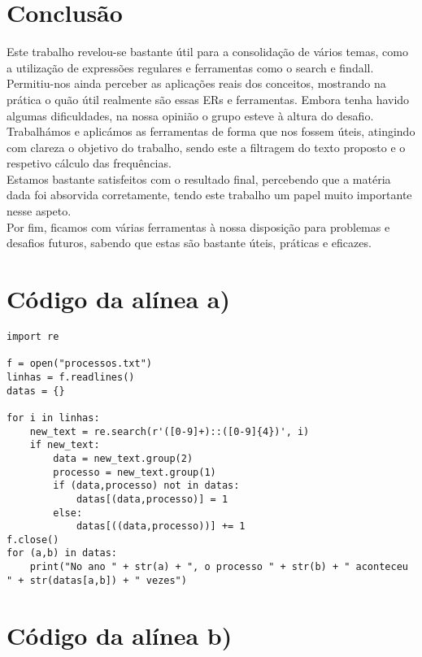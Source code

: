 \documentclass[11pt,a4paper]{report}%
\begin{document}
\chapter{Conclusão} \label{concl}
Este trabalho revelou-se bastante útil para a consolidação de vários temas, como a utilização de expressões regulares e ferramentas como o search e findall.
\\
Permitiu-nos ainda perceber as aplicações reais dos conceitos, mostrando na prática o quão útil realmente são essas ERs e ferramentas. Embora tenha havido algumas dificuldades, na nossa opinião o grupo esteve à altura do desafio. Trabalhámos e aplicámos as ferramentas de forma que nos fossem úteis, atingindo com clareza o objetivo do trabalho, sendo este a filtragem do texto proposto e o respetivo cálculo das frequências.
\\
Estamos bastante satisfeitos com o resultado final, percebendo que a matéria dada foi absorvida corretamente, tendo este trabalho um papel muito importante nesse aspeto.
\\
Por fim, ficamos com várias ferramentas à nossa disposição para problemas e desafios futuros, sabendo que estas são bastante úteis, práticas e eficazes.

\appendix %

\chapter{Código da alínea a)}

\begin{lstlisting}
import re

f = open("processos.txt")
linhas = f.readlines()
datas = {}

for i in linhas:
    new_text = re.search(r'([0-9]+)::([0-9]{4})', i)
    if new_text:
        data = new_text.group(2)
        processo = new_text.group(1)
        if (data,processo) not in datas: 
            datas[(data,processo)] = 1 
        else: 
            datas[((data,processo))] += 1 
f.close()
for (a,b) in datas: 
    print("No ano " + str(a) + ", o processo " + str(b) + " aconteceu " + str(datas[a,b]) + " vezes")

\end{lstlisting}

\newpage

\chapter{Código da alínea b)}
\end{document}
